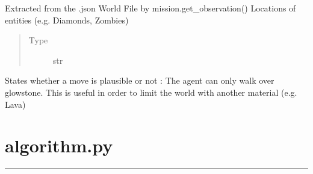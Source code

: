 \documentclass[letterpaper,10pt,english]{sphinxmanual}
\begin{document}
\begin{fulllineitems}
\begin{fulllineitems}
\begin{quote}
\begin{description}
\end{description}\end{quote}

\end{fulllineitems}


\begin{fulllineitems}
\label{\detokenize{index:mission.observation.set_entity_locations}}
Extracted from the .json World File by mission.get\_observation()
Locations of entities (e.g. Diamonds, Zombies)
\begin{quote}\begin{description}
\item[{Type}] \leavevmode
str

\end{description}\end{quote}

\end{fulllineitems}


\begin{fulllineitems}
\label{\detokenize{index:mission.observation.at_junction}}
States whether a move is plausible or not : The agent can only walk over glowstone.
This is useful in order to limit the world with another material (e.g. Lava)

\end{fulllineitems}


\end{fulllineitems}

\label{\detokenize{index:module-algorithms.algorithm}}

\chapter{algorithm.py}
\label{\detokenize{index:algorithm-py}}

\bigskip\hrule\bigskip

\end{document}
